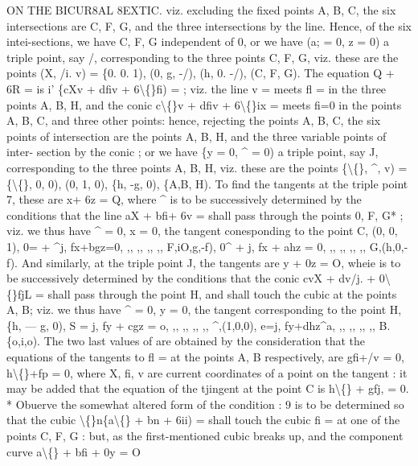 \documentclass[11pt,a4paper]{book}
\begin{document}
ON THE BICUR8AL 8EXTIC.
viz.
excluding the
fixed
points A, B,
C, the
six
intersections are
C, F,
G, and
the three
intersections by the
line.
Hence,
of
the
six
intei-sections, we
have
C, F, G independent
of
0,
or we
have
(a; = 0, z = 0)
a
triple
point, say
/,
corresponding
to
the
three
points
C, F, G,
viz.
these are the points
(X,
/i.
v) = \{0.
0.
1),
(0, g, -/),
(h,
0. -/),
(C,
F,
G).
The equation Q + 6R =
is
i' \{cXv + dfiv + 6\textbackslash\{\}fi) =
;
viz.
the
line
v =
meets
fl =
in
the
three
points
A,
B,
H,
and
the
conic
c\textbackslash\{\}v + dfiv + 6\textbackslash\{\}ix =
meets fi=0
in
the
points A, B,
C, and
three
other
points:
hence,
rejecting
the
points
A,
B,
C,
the
six
points
of
intersection
are
the
points
A, B, H, and
the
three
variable
points of
inter-
section by the
conic
;
or we
have
\{y = 0,
\textasciicircum{} = 0)
a
triple
point, say J, corresponding to
the three points A, B, H,
viz.
these
are
the
points
\{\textbackslash\{\},
\textasciicircum{},
v) = \{\textbackslash\{\},
0,
0),
(0,
1,
0),
\{h, -g,
0),
\{A,B, H).
To
find
the tangents
at
the
triple
point
7,
these
are x+ 6z = Q, where \textasciicircum{}
is
to be
successively
determined
by
the
conditions
that
the
line
aX + bfi+ 6v =
shall
pass
through
the
points
0, F, G*
;
viz. we
thus
have
\textasciicircum{} = 0,
x = 0, the tangent conesponding to the point
C,
(0,
0,
1),
0= + \textasciicircum{}j,
fx+bgz=0,
,,
,,
,,
,,
F,iO,g,-f),
0\textasciicircum{} + j,
fx + ahz = 0,
,,
,,
,,
,,
G,(h,0,-f).
And
similarly,
at
the
triple
point
J,
the
tangents
are
y + 0z = O,
wheie
is
to
be
successively determined
by the
conditions
that
the
conic cvX + dv/j. + 0\textbackslash\{\}fjL =
shall
pass
through the point H, and
shall touch the cubic at the points A, B;
viz. we thus have
\textasciicircum{} = 0,
y = 0, the tangent corresponding to the point H,
\{h, --- g,
0),
S = j,
fy + cgz = o,
,,
,,
,,
,,
\textasciicircum{},(1,0,0),
e=j,
fy+dhz\textasciicircum{}a,
,,
,,
,,
,,
B.\{o,i,o).
The
two
last
values
of
are
obtained
by the
consideration
that the equations of
the
tangents
to
fl =
at
the
points
A, B
respectively,
are
gfi+/v = 0, h\textbackslash\{\}+fp = 0,
where
X,
fi,
v
are
current
coordinates
of a
point
on
the
tangent
:
it
may
be
added
that the equation of the tjingent at the point C
is h\textbackslash\{\} + gfj, = 0.
*
Obuerve
the
somewhat
altered
form
of
the
condition
:
9
is
to
be
determined
so
that
the
cubic
\textbackslash\{\}n\{a\textbackslash\{\} + bn + 6ii) =
shall
touch
the
cubic
fi =
at
one
of
the
points
C,
F,
G
:
but,
as
the
first-mentioned
cubic
breaks
up,
and
the component
curve
a\textbackslash\{\} + bfi + 0y = O
\end{document}
